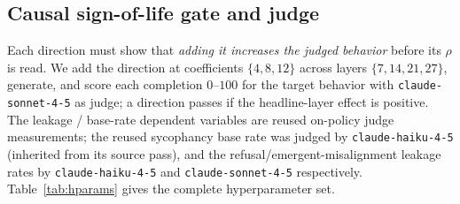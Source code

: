 \documentclass[11pt]{article}
\let\mathrho\rho
\renewcommand{\rho}{\ensuremath{\mathrho}}
\begin{document}
\subsection{Causal sign-of-life gate and judge}
Each direction must show that \emph{adding it increases the judged behavior} before its
\rho{} is read. We add the direction at coefficients $\{4,8,12\}$ across layers
$\{7,14,21,27\}$, generate, and score each completion $0$--$100$ for the target behavior
with \texttt{claude-sonnet-4-5} as judge; a direction passes if the headline-layer effect
is positive. The leakage / base-rate dependent variables are reused on-policy judge
measurements; the reused sycophancy base rate was judged by \texttt{claude-haiku-4-5}
(inherited from its source pass), and the refusal/emergent-misalignment leakage rates by
\texttt{claude-haiku-4-5} and \texttt{claude-sonnet-4-5} respectively. Table~\ref{tab:hparams}
gives the complete hyperparameter set.
\end{document}
